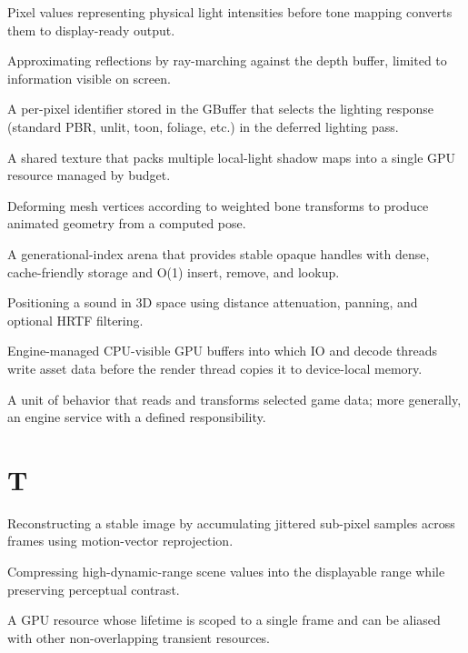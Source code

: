 \documentclass[
  11pt,
  letterpaper,
  DIV=11,
  numbers=noendperiod,
  twoside,
  open=right]{scrreprt}
\providecommand{\tightlist}{%
  \setlength{\itemsep}{0pt}\setlength{\parskip}{0pt}}
\begin{document}
\begin{description}
\tightlist
\item[\textbf{Scene-referred}]
Pixel values representing physical light intensities before tone mapping
converts them to display-ready output.
\item[\textbf{Screen-space reflections}]
Approximating reflections by ray-marching against the depth buffer,
limited to information visible on screen.
\item[\textbf{Shading model}]
A per-pixel identifier stored in the GBuffer that selects the lighting
response (standard PBR, unlit, toon, foliage, etc.) in the deferred
lighting pass.
\item[\textbf{Shadow atlas}]
A shared texture that packs multiple local-light shadow maps into a
single GPU resource managed by budget.
\item[\textbf{Skinning}]
Deforming mesh vertices according to weighted bone transforms to produce
animated geometry from a computed pose.
\item[\textbf{SlotMap}]
A generational-index arena that provides stable opaque handles with
dense, cache-friendly storage and O(1) insert, remove, and lookup.
\item[\textbf{Spatialization}]
Positioning a sound in 3D space using distance attenuation, panning, and
optional HRTF filtering.
\item[\textbf{Staging pool}]
Engine-managed CPU-visible GPU buffers into which IO and decode threads
write asset data before the render thread copies it to device-local
memory.
\item[\textbf{System}]
A unit of behavior that reads and transforms selected game data; more
generally, an engine service with a defined responsibility.
\end{description}

\section*{T}\label{t}


\begin{description}
\tightlist
\item[\textbf{Temporal anti-aliasing (TAA)}]
Reconstructing a stable image by accumulating jittered sub-pixel samples
across frames using motion-vector reprojection.
\item[\textbf{Tone mapping}]
Compressing high-dynamic-range scene values into the displayable range
while preserving perceptual contrast.
\item[\textbf{Transient resource}]
A GPU resource whose lifetime is scoped to a single frame and can be
aliased with other non-overlapping transient resources.
\end{description}
\end{document}
